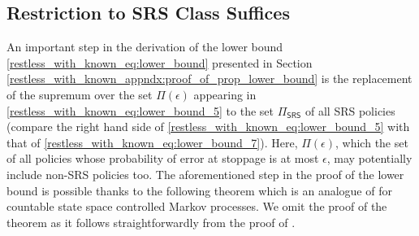 \subsection{Restriction to SRS Class Suffices} \label{restless_with_known_appndx:an_important_theorem}
An important step in the derivation of the lower bound \eqref{restless_with_known_eq:lower_bound} presented in Section \ref{restless_with_known_appndx:proof_of_prop_lower_bound} is the replacement of the supremum over the set $\Pi(\epsilon)$ appearing in \eqref{restless_with_known_eq:lower_bound_5} to the set $\Pi_{\textsf{SRS}}$ of all SRS policies (compare the right hand side of \eqref{restless_with_known_eq:lower_bound_5} with that of \eqref{restless_with_known_eq:lower_bound_7}). Here, $\Pi(\epsilon)$, which the set of all policies whose probability of error at stoppage is at most $\epsilon$, may potentially include non-SRS policies too. The aforementioned step in the proof of the lower bound is possible thanks to the following theorem which is an analogue of \cite[Theorem 8.8.2]{puterman2014markov} for countable state space controlled Markov processes. We omit the proof of the theorem as it follows straightforwardly from the proof of \cite[Theorem 8.8.2]{puterman2014markov}. 

